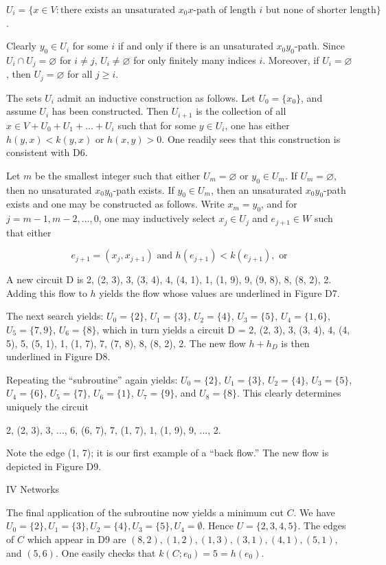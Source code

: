 $U_i = \{x \in V : \text{there exists an unsaturated } x_0x\text{-path of length } i \text{ but none of shorter length}\}$.

Clearly $y_0 \in U_i$ for some $i$ if and only if there is an unsaturated $x_0y_0$-path. Since $U_i \cap U_j = \varnothing$ for $i \neq j$, $U_i \neq \varnothing$ for only finitely many indices $i$. Moreover, if $U_i = \varnothing$, then $U_j = \varnothing$ for all $j \geq i$.

The sets $U_i$ admit an inductive construction as follows. Let $U_0 = \{x_0\}$, and assume $U_i$ has been constructed. Then $U_{i+1}$ is the collection of all $x \in V + U_0 + U_1 + \ldots + U_i$ such that for some $y \in U_i$, one has either $h(y, x) < k(y, x)$ or $h(x, y) > 0$. One readily sees that this construction is consistent with D6.

Let $m$ be the smallest integer such that either $U_m = \varnothing$ or $y_0 \in U_m$. If $U_m = \varnothing$, then no unsaturated $x_0y_0$-path exists. If $y_0 \in U_m$, then an unsaturated $x_0y_0$-path exists and one may be constructed as follows. Write $x_m = y_0$, and for $j = m - 1, m - 2, \ldots, 0$, one may inductively select $x_j \in U_j$ and $e_{j+1} \in W$ such that either

$$e_{j+1} = (x_j, x_{j+1}) \text{ and } h(e_{j+1}) < k(e_{j+1}), \text{ or}$$

A new circuit D is 2, (2, 3), 3, (3, 4), 4, (4, 1), 1, (1, 9), 9, (9, 8), 8, (8, 2), 2. Adding this flow to $h$ yields the flow whose values are underlined in Figure D7.

The next search yields: $U_0 = \{2\}$, $U_1 = \{3\}$, $U_2 = \{4\}$, $U_3 = \{5\}$, $U_4 = \{1, 6\}$, $U_5 = \{7, 9\}$, $U_6 = \{8\}$, which in turn yields a circuit D = 2, (2, 3), 3, (3, 4), 4, (4, 5), 5, (5, 1), 1, (1, 7), 7, (7, 8), 8, (8, 2), 2. The new flow $h + h_D$ is then underlined in Figure D8.

Repeating the “subroutine” again yields: $U_0 = \{2\}$, $U_1 = \{3\}$, $U_2 = \{4\}$, $U_3 = \{5\}$, $U_4 = \{6\}$, $U_5 = \{7\}$, $U_6 = \{1\}$, $U_7 = \{9\}$, and $U_8 = \{8\}$. This clearly determines uniquely the circuit

2, (2, 3), 3, ..., 6, (6, 7), 7, (1, 7), 1, (1, 9), 9, ..., 2.

Note the edge (1, 7); it is our first example of a “back flow.” The new flow is depicted in Figure D9.

IV Networks

The final application of the subroutine now yields a minimum cut $C$. We have $U_0 = \{2\}, U_1 = \{3\}, U_2 = \{4\}, U_3 = \{5\}, U_4 = \emptyset$. Hence $U = \{2, 3, 4, 5\}$. The edges of $C$ which appear in D9 are $(8, 2), (1, 2), (1, 3), (3, 1), (4, 1), (5, 1)$, and $(5, 6)$. One easily checks that $k(C; e_0) = 5 = h(e_0)$.

